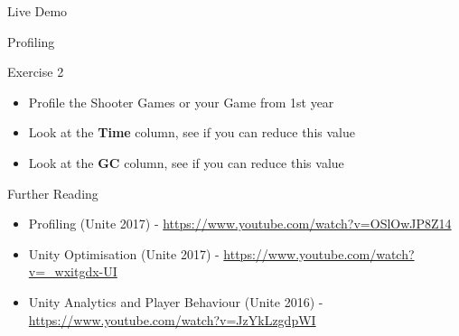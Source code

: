 \begin{frame}{Live Demo}
	\begin{center}
		Profiling
	\end{center}
\end{frame}

\begin{frame}{Exercise 2}
	\begin{itemize}
		\item Profile the Shooter Games or your Game from 1st year
		\item Look at the \textbf{Time} column, see if you can reduce this value
		\item Look at the \textbf{GC} column, see if you can reduce this value
	\end{itemize}
\end{frame}

\begin{frame}{Further Reading}
	\begin{itemize}
		\item Profiling (Unite 2017) - \url{https://www.youtube.com/watch?v=OSlOwJP8Z14}
		\item Unity Optimisation (Unite 2017) - \url{https://www.youtube.com/watch?v=_wxitgdx-UI}
		\item Unity Analytics and Player Behaviour (Unite 2016) -\url{https://www.youtube.com/watch?v=JzYkLzgdpWI} 
	\end{itemize}
\end{frame}

